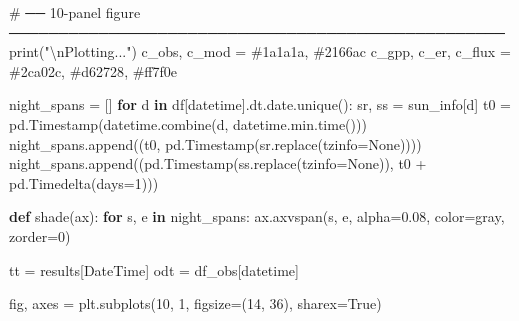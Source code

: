 \documentclass[
  letterpaper,
  DIV=11,
  numbers=noendperiod]{scrartcl}
\newenvironment{Shaded}{\begin{snugshade}}{\end{snugshade}}
\newcommand{\BuiltInTok}[1]{\textcolor[rgb]{0.00,0.23,0.31}{#1}}
\newcommand{\CharTok}[1]{\textcolor[rgb]{0.13,0.47,0.30}{#1}}
\newcommand{\CommentTok}[1]{\textcolor[rgb]{0.37,0.37,0.37}{#1}}
\newcommand{\ControlFlowTok}[1]{\textcolor[rgb]{0.00,0.23,0.31}{\textbf{#1}}}
\newcommand{\DecValTok}[1]{\textcolor[rgb]{0.68,0.00,0.00}{#1}}
\newcommand{\FloatTok}[1]{\textcolor[rgb]{0.68,0.00,0.00}{#1}}
\newcommand{\KeywordTok}[1]{\textcolor[rgb]{0.00,0.23,0.31}{\textbf{#1}}}
\newcommand{\NormalTok}[1]{\textcolor[rgb]{0.00,0.23,0.31}{#1}}
\newcommand{\OperatorTok}[1]{\textcolor[rgb]{0.37,0.37,0.37}{#1}}
\newcommand{\StringTok}[1]{\textcolor[rgb]{0.13,0.47,0.30}{#1}}
\newcommand{\VariableTok}[1]{\textcolor[rgb]{0.07,0.07,0.07}{#1}}
\begin{document}
\begin{Shaded}
\begin{Highlighting}[]
\CommentTok{\# ── 10{-}panel figure ──────────────────────────────────────────────────}
\BuiltInTok{print}\NormalTok{(}\StringTok{"}\CharTok{\textbackslash{}n}\StringTok{Plotting..."}\NormalTok{)}
\NormalTok{c\_obs, c\_mod }\OperatorTok{=} \StringTok{\textquotesingle{}\#1a1a1a\textquotesingle{}}\NormalTok{, }\StringTok{\textquotesingle{}\#2166ac\textquotesingle{}}
\NormalTok{c\_gpp, c\_er, c\_flux }\OperatorTok{=} \StringTok{\textquotesingle{}\#2ca02c\textquotesingle{}}\NormalTok{, }\StringTok{\textquotesingle{}\#d62728\textquotesingle{}}\NormalTok{, }\StringTok{\textquotesingle{}\#ff7f0e\textquotesingle{}}

\NormalTok{night\_spans }\OperatorTok{=}\NormalTok{ []}
\ControlFlowTok{for}\NormalTok{ d }\KeywordTok{in}\NormalTok{ df[}\StringTok{\textquotesingle{}datetime\textquotesingle{}}\NormalTok{].dt.date.unique():}
\NormalTok{    sr, ss }\OperatorTok{=}\NormalTok{ sun\_info[d]}
\NormalTok{    t0 }\OperatorTok{=}\NormalTok{ pd.Timestamp(datetime.combine(d, datetime.}\BuiltInTok{min}\NormalTok{.time()))}
\NormalTok{    night\_spans.append((t0, pd.Timestamp(sr.replace(tzinfo}\OperatorTok{=}\VariableTok{None}\NormalTok{))))}
\NormalTok{    night\_spans.append((pd.Timestamp(ss.replace(tzinfo}\OperatorTok{=}\VariableTok{None}\NormalTok{)),}
\NormalTok{                        t0 }\OperatorTok{+}\NormalTok{ pd.Timedelta(days}\OperatorTok{=}\DecValTok{1}\NormalTok{)))}

\KeywordTok{def}\NormalTok{ shade(ax):}
    \ControlFlowTok{for}\NormalTok{ s, e }\KeywordTok{in}\NormalTok{ night\_spans:}
\NormalTok{        ax.axvspan(s, e, alpha}\OperatorTok{=}\FloatTok{0.08}\NormalTok{, color}\OperatorTok{=}\StringTok{\textquotesingle{}gray\textquotesingle{}}\NormalTok{, zorder}\OperatorTok{=}\DecValTok{0}\NormalTok{)}

\NormalTok{tt  }\OperatorTok{=}\NormalTok{ results[}\StringTok{\textquotesingle{}DateTime\textquotesingle{}}\NormalTok{]}
\NormalTok{odt }\OperatorTok{=}\NormalTok{ df\_obs[}\StringTok{\textquotesingle{}datetime\textquotesingle{}}\NormalTok{]}

\NormalTok{fig, axes }\OperatorTok{=}\NormalTok{ plt.subplots(}\DecValTok{10}\NormalTok{, }\DecValTok{1}\NormalTok{, figsize}\OperatorTok{=}\NormalTok{(}\DecValTok{14}\NormalTok{, }\DecValTok{36}\NormalTok{), sharex}\OperatorTok{=}\VariableTok{True}\NormalTok{)}


\end{Highlighting}
\end{Shaded}
\end{document}
